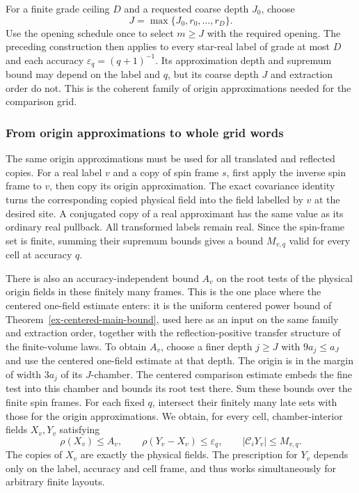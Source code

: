 For a finite grade ceiling $D$ and a requested coarse depth $J_0$, choose
\[
 J=\max\{J_0,r_0,\ldots,r_D\}.
\]
Use the opening schedule once to select $m\geq J$ with the required
opening. The preceding construction then applies to every star-real label
of grade at most $D$ and each accuracy $\varepsilon_q=(q+1)^{-1}$.
Its approximation depth and supremum bound may depend on the label and
$q$, but its coarse depth $J$ and extraction order do not. This is the
coherent family of origin approximations needed for the comparison grid.

\subsubsection{From origin approximations to whole grid words}

The same origin approximations must be used for all translated and
reflected copies. For a real label $v$ and a copy of spin frame $s$, first
apply the inverse spin frame to $v$, then copy its origin approximation.
The exact covariance identity turns the corresponding copied physical
field into the field labelled by $v$ at the desired site. A conjugated
copy of a real approximant has the same value as its ordinary real
pullback. All transformed labels remain real. Since the spin-frame set
is finite, summing their supremum bounds gives a bound $M_{v,q}$ valid
for every cell at accuracy $q$.

There is also an accuracy-independent bound $A_v$ on the root tests of
the physical origin fields in these finitely many frames. This is the one
place where the centered one-field estimate enters: it is the uniform
centered power bound of Theorem~\ref{ex-centered-main-bound}, used here
as an input on the same family and extraction order, together with the
reflection-positive transfer structure of the finite-volume laws. To
obtain $A_v$,
choose a finer depth $j\geq J$ with $9a_j\leq a_J$ and use the centered
one-field estimate at that depth. The origin is in the margin of width
$3a_j$ of its $J$-chamber. The centered comparison estimate embeds the
fine test into this chamber and bounds its root test there. Sum these
bounds over the finite spin frames. For each fixed $q$, intersect their
finitely many late sets with those for the origin approximations. We
obtain, for every cell, chamber-interior fields $X_v,Y_v$ satisfying
\[
 \rho(X_v)\leq A_v,\qquad
 \rho(Y_v-X_v)\leq\varepsilon_q,
 \qquad |\mathcal C_iY_v|\leq M_{v,q}.
\]
The copies of $X_v$ are exactly the physical fields. The prescription for
$Y_v$ depends only on the label, accuracy and cell frame, and thus works
simultaneously for arbitrary finite layouts.

